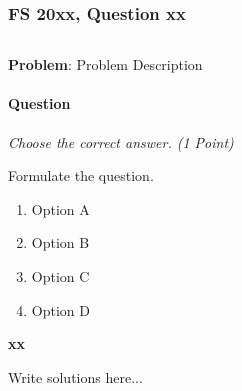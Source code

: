 \subsubsection{FS 20xx, Question xx} \(\quad \)

\vspace{1\baselineskip}

\textbf{Problem}: Problem Description

\paragraph{Question} \textit{Choose the correct answer. (1 Point)} 

Formulate the question.

\vspace{1\baselineskip}

\begin{multicols}{2}
    \begin{enumerate}[label=\fbox{\Alph*}]
        \item Option A
        \item Option B
        \item Option C
        \item Option D
    \end{enumerate}
\end{multicols}

\vspace{1\baselineskip}

\begin{solution}
    \textbf{xx} 

    \vspace{1\baselineskip}

    Write solutions here...

\end{solution}